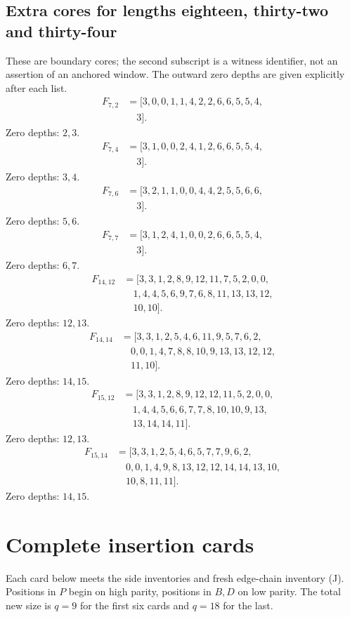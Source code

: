 \documentclass[11pt,a4paper]{article}
\theoremstyle{definition}\newtheorem{definition}[theorem]{Definition}
\theoremstyle{remark}\newtheorem{remark}[theorem]{Remark}
\begin{document}
\subsection{Extra cores for lengths eighteen, thirty-two and thirty-four}
These are boundary cores; the second subscript is a witness identifier,
not an assertion of an anchored window. The outward zero depths are
given explicitly after each list.
\[\begin{aligned}
F_{7,2}&=[3,0,0,1,1,4,2,2,6,6,5,5,4,\\
&\quad 3].
\end{aligned}\]
Zero depths: $2,3$.
\[\begin{aligned}
F_{7,4}&=[3,1,0,0,2,4,1,2,6,6,5,5,4,\\
&\quad 3].
\end{aligned}\]
Zero depths: $3,4$.
\[\begin{aligned}
F_{7,6}&=[3,2,1,1,0,0,4,4,2,5,5,6,6,\\
&\quad 3].
\end{aligned}\]
Zero depths: $5,6$.
\[\begin{aligned}
F_{7,7}&=[3,1,2,4,1,0,0,2,6,6,5,5,4,\\
&\quad 3].
\end{aligned}\]
Zero depths: $6,7$.
\[\begin{aligned}
F_{14,12}&=[3,3,1,2,8,9,12,11,7,5,2,0,0,\\
&\quad 1,4,4,5,6,9,7,6,8,11,13,13,12,\\
&\quad 10,10].
\end{aligned}\]
Zero depths: $12,13$.
\[\begin{aligned}
F_{14,14}&=[3,3,1,2,5,4,6,11,9,5,7,6,2,\\
&\quad 0,0,1,4,7,8,8,10,9,13,13,12,12,\\
&\quad 11,10].
\end{aligned}\]
Zero depths: $14,15$.
\[\begin{aligned}
F_{15,12}&=[3,3,1,2,8,9,12,12,11,5,2,0,0,\\
&\quad 1,4,4,5,6,6,7,7,8,10,10,9,13,\\
&\quad 13,14,14,11].
\end{aligned}\]
Zero depths: $12,13$.
\[\begin{aligned}
F_{15,14}&=[3,3,1,2,5,4,6,5,7,7,9,6,2,\\
&\quad 0,0,1,4,9,8,13,12,12,14,14,13,10,\\
&\quad 10,8,11,11].
\end{aligned}\]
Zero depths: $14,15$.
\section{Complete insertion cards}\label{app:cards}
Each card below meets the side inventories and fresh edge-chain inventory
(J). Positions in $P$ begin on high parity, positions in $B,D$ on low parity.
The total new size is $q=9$ for the first six cards and $q=18$ for the last.
\end{document}
